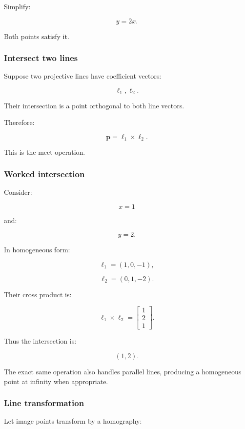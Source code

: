 Simplify:

\[
 \boxed{y=2x}.
\]

Both points satisfy it.

\subsubsection{Intersect two lines}\label{intersect-two-lines}

Suppose two projective lines have coefficient vectors:

\[
 \boldsymbol\ell_1,\boldsymbol\ell_2.
\]

Their intersection is a point orthogonal to both line vectors.

Therefore:

\[
 \boxed{ \mathbf p=\boldsymbol\ell_1\times\boldsymbol\ell_2 }.
\]

This is the meet operation.

\subsubsection{Worked intersection}\label{worked-intersection}

Consider:

\[
 x=1
\]

and:

\[
 y=2.
\]

In homogeneous form:

\[
 \boldsymbol\ell_1=(1,0,-1),
\]

\[
 \boldsymbol\ell_2=(0,1,-2).
\]

Their cross product is:

\[
 \boldsymbol\ell_1\times\boldsymbol\ell_2 = \begin{bmatrix} 1\\2\\1 \end{bmatrix}.
\]

Thus the intersection is:

\[
 \boxed{(1,2)}.
\]

The exact same operation also handles parallel lines, producing a homogeneous point at infinity when appropriate.

\subsubsection{Line transformation}\label{line-transformation}

Let image points transform by a homography:

